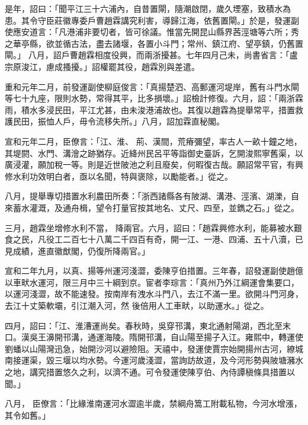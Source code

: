 \begin{pinyinscope}
 是年，詔曰：「聞平江三十六浦內，自昔置閘，隨潮啟閉，歲久堙塞，致積水為患。其令守臣莊徽專委戶曹趙霖講究利害，導歸江海，依舊置閘。」於是，發運副使應安道言：「凡港浦非要切者，皆可徐議。惟當先開昆山縣界茜涇塘等六所；秀之華亭縣，欲並循古法，盡去諸堰，各置小斗門；常州、鎮江府、望亭鎮，仍舊置閘。」
 八月，詔戶曹趙霖相度役興，而兩浙擾甚。七年四月己未，尚書省言：「盧宗原浚江，慮成搔擾。」詔權罷其役，趙霖別與差遣。



 重和元年二月，前發運副使柳庭俊言：「真揚楚泗、高郵運河堤岸，舊有斗門水閘等七十九座，限則水勢，常得其平，比多損壞。」詔檢計修復。六月，詔：「兩浙霖雨，積水多浸民田，平江尤甚，由未浚港浦故也。其復以趙霖為提舉常平，措置救護民田，振恤人戶，毋令流移失所。」八月，詔加霖直秘閣。



 宣和元年二月，臣僚言：「江、淮、
 荊、漢間，荒瘠彌望，率古人一畝十鐘之地，其堤閼、水門、溝澮之跡猶存。近絳州民呂平等詣御史臺訴，乞開浚熙寧舊渠，以廣浸灌，願加稅一等。則是近世陂池之利且廢矣，何暇復古哉。願詔常平官，有興修水利功效明白者，亟以名聞，特與褒除，以勵能者。」從之。



 八月，提舉專切措置水利農田所奏：「浙西諸縣各有陂湖、溝港、涇濱、湖濼，自來蓄水灌溉，及通舟楫，望令打量官按其地名、丈尺、四至，並鐫之石。」從之。



 三月，趙霖坐增修水利不當，
 降兩官。六月，詔曰：「趙霖興修水利，能募被水艱食之民，凡役工二百七十八萬二千四百有奇，開一江、一港、四浦、五十八瀆，已見成績，進直徽猷閣，仍復所降兩官。」



 宣和二年九月，以真、揚等州運河淺澀，委陳亨伯措置。三年春，詔發運副使趙億以車畎水運河，限三月中三十綱到京。宦者李琮言：「真州乃外江綱運會集要口，以運河淺澀，故不能速發。按南岸有洩水斗門八，去江不滿一里。欲開斗門河身，去江十丈築軟壩，引江潮入河，然
 後倍用人工車畎，以助運水。」從之。



 四月，詔曰：「江、淮漕運尚矣。春秋時，吳穿邗溝，東北通射陽湖，西北至末口。漢吳王濞開邗溝，通運海陵。隋開邗溝，自山陽至揚子入江。雍熙中，轉運使劉蟠以山陽灣迅急，始開沙河以避險阻。天禧中，發運使賈宗始開揚州古河，繚城南接運渠，毀三堰以均水勢。今運河歲淺澀，當詢訪故道，及今河形勢與陂塘瀦水之地，講究措置悠久之利，以濟不通。可令發運使陳亨伯、內侍譚稹條具措置以聞。」



 八月，
 臣僚言：「比緣淮南運河水澀逾半歲，禁綱舟篙工附載私物，今河水增漲，其令如舊。」




\end{pinyinscope}
